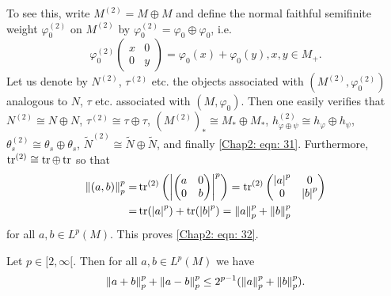 To see this, write $M^{(2)}=M\oplus M$ and define the normal faithful semifinite weight $\varphi_0^{(2)}$ on $M^{(2)}$ by $\varphi_0^{(2)}=\varphi_0\oplus \varphi_0$, i.e.
\[
    \varphi_0^{(2)}\begin{pmatrix}
        x & 0 \\
        0 & y
    \end{pmatrix}=\varphi_0(x)+\varphi_0(y), x,y\in M_+.
\]
Let us denote by $N^{(2)}$, $\tau^{(2)}$ etc. the objects associated with $(M^{(2)},\varphi_0^{(2)})$ analogous to $N$, $\tau$ etc. associated with $(M,\varphi_0)$. Then one easily verifies that $N^{(2)}\cong N\oplus N$, $\tau^{(2)}\cong \tau\oplus \tau$, $(M^{(2)})_*\cong M_*\oplus M_*$, $h_{\varphi\oplus \psi}^{(2)}\cong h_\varphi \oplus h_\psi$, $\theta_s^{(2)}\cong \theta_s\oplus \theta_s$, $\tilde{N}^{(2)}\cong \tilde{N}\oplus \tilde{N}$, and finally \eqref{Chap2: eqn: 31}. Furthermore, $\tr^{(2)}\cong \tr\oplus \tr$ so that
\[
    \begin{split}
        \norm{(a,b)}_p^p=&\tr^{(2)}\left( \abs{\begin{pmatrix}
                a & 0 \\
                0 & b
            \end{pmatrix}}^p \right)=\tr^{(2)}\begin{pmatrix}
            \abs{a}^p & 0         \\
            0         & \abs{b}^p
        \end{pmatrix}\\
        =&\tr(\abs{a}^p)+\tr(\abs{b}^p)=\norm{a}_p^p+\norm{b}_p^p
    \end{split}
\]
for all $a,b\in L^p(M)$. This proves \eqref{Chap2: eqn: 32}.
\begin{proposition}
    Let $p\in[2,\infty[$. Then for all $a,b\in L^p(M)$ we have
    \[
        \norm{a+b}_p^p+\norm{a-b}_p^p\leq 2^{p-1}(\norm{a}_p^p+\norm{b}_p^p).
    \]
\end{proposition}
